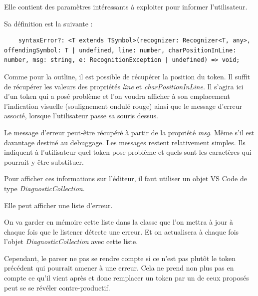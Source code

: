 \documentclass[
    iict, %
    il, %
]{heig-tb}
\begin{document}
Elle contient des paramètres intéressants à exploiter pour informer l'utilisateur.

Sa définition est la suivante :
\begin{listing}[!ht]
    \begin{verbatim}
    syntaxError?: <T extends TSymbol>(recognizer: Recognizer<T, any>, offendingSymbol: T | undefined, line: number, charPositionInLine: number, msg: string, e: RecognitionException | undefined) => void;
    \end{verbatim}
\end{listing}


Comme pour la outline, il est possible de récupérer la position du token. Il suffit de récupérer les valeurs des propriétés \emph{line} et \emph{charPositionInLine}.
Il s'agira ici d'un token qui a posé problème et l'on voudra afficher à son emplacement l'indication visuelle (soulignement ondulé rouge) ainsi que le message d'erreur associé, lorsque l'utilisateur passe
sa souris dessus.

Le message d'erreur peut-être récupéré à partir de la propriété \emph{msg}. Même s'il est davantage destiné au debuggage.
Les messages restent relativement simples. Ils indiquent à l'utilisateur quel token pose problème et quels sont les caractères qui pourrait y être substituer.

Pour afficher ces informations sur l'éditeur, il faut utiliser un objet VS Code de type \emph{DiagnosticCollection}.

Elle peut afficher une liste d'erreur.

On va garder en mémoire cette liste dans la classe que l'on mettra à jour à chaque fois que le listener détecte une erreur.
Et on actualisera à chaque fois l'objet \emph{DiagnosticCollection} avec cette liste.

Cependant, le parser ne pas se rendre compte si ce n'est pas plutôt le token précédent qui pourrait amener à une erreur.
Cela ne prend non plus pas en compte ce qu'il vient après et donc remplacer un token par un de ceux proposés peut se se révéler contre-productif.
\end{document}
